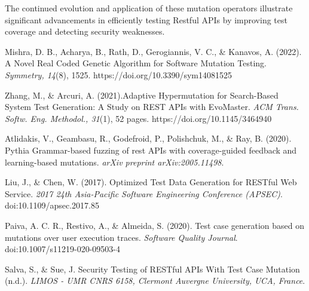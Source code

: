 \documentclass[12pt, letterpaper,twocolumn]{article}
\theoremstyle{remark}
\theoremstyle{definition}
\begin{document}
The continued evolution and application of these mutation operators illustrate significant advancements in efficiently testing Restful APIs by improving test coverage and detecting security weaknesses.

\begin{thebibliography}{9}

Mishra, D. B., Acharya, B., Rath, D., Gerogiannis, V. C., \& Kanavos, A. (2022). A Novel Real Coded Genetic Algorithm for Software Mutation Testing. \textit{Symmetry, 14}(8), 1525. https://doi.org/10.3390/sym14081525

Zhang, M., \& Arcuri, A. (2021).Adaptive Hypermutation for Search-Based System Test Generation: A Study on REST APIs with EvoMaster. \textit{ACM Trans. Softw. Eng. Methodol., 31}(1), 52 pages. https://doi.org/10.1145/3464940

Atlidakis, V., Geambasu, R., Godefroid, P., Polishchuk, M., \& Ray, B. (2020). Pythia Grammar-based fuzzing of rest APIs with coverage-guided feedback and learning-based mutations. \textit{arXiv preprint arXiv:2005.11498}.

Liu, J., \& Chen, W. (2017). Optimized Test Data Generation for RESTful Web Service. \textit{2017 24th Asia-Pacific Software Engineering Conference (APSEC)}. doi:10.1109/apsec.2017.85

Paiva, A. C. R., Restivo, A., \& Almeida, S. (2020). Test case generation based on mutations over user execution traces. \textit{Software Quality Journal}. doi:10.1007/s11219-020-09503-4

Salva, S., \& Sue, J. Security Testing of RESTful APIs With Test Case Mutation (n.d.). \textit{LIMOS - UMR CNRS 6158, Clermont Auvergne University, UCA, France}.

\end{thebibliography}
\end{document}
